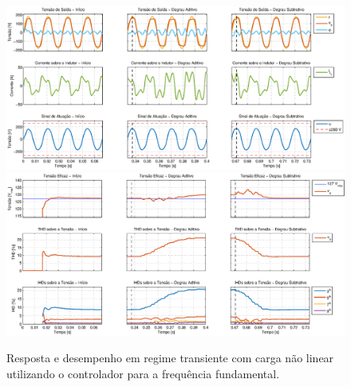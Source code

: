 \documentclass[repeatfields,oneside]{tcc}
\begin{document}
\begin{figure}[h]
    \centering
    \caption{Resposta e desempenho em regime transiente com carga não linear utilizando o controlador para a frequência fundamental.}
    \includegraphics[trim={80 50 1 20}, clip, width=\linewidth]{fig/closed_1.eps}
    \\\vspace{0.475cm}
    \includegraphics[trim={80 20 1 20}, clip, width=\linewidth]{fig/harm_1.eps}
\end{figure}
\end{document}
